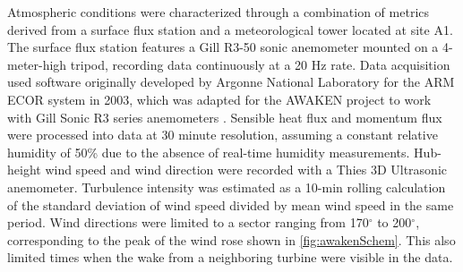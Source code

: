 \documentclass[%
 aip,
 amsmath,
 amssymb,
preprint,%
]{revtex4-2}
\begin{document}
Atmospheric conditions were characterized through a combination of metrics derived from a surface flux station \cite{a2e_awaken_surfaceMet} and a meteorological tower \cite{a2e_awaken_kp_metTower} located at site A1. The surface flux station features a Gill R3-50 sonic anemometer mounted on a 4-meter-high tripod, recording data continuously at a 20 Hz rate. Data acquisition used software originally developed by Argonne National Laboratory for the ARM ECOR system in 2003, which was adapted for the AWAKEN project to work with Gill Sonic R3 series anemometers \cite{cook2018eddy}. Sensible heat flux and momentum flux were processed into data at 30 minute resolution, assuming a constant relative humidity of 50\% due to the absence of real-time humidity measurements. 
Hub-height wind speed and wind direction were recorded with a Thies 3D Ultrasonic anemometer. Turbulence intensity was estimated as a 10-min rolling calculation of the standard deviation of wind speed divided by mean wind speed in the same period.
Wind directions were limited to a sector ranging from 170$^\circ$ to 200$^\circ$, corresponding to the peak of the wind rose shown in \cref{fig:awakenSchem}. This also limited times when the wake from a neighboring turbine were visible in the data.
\end{document}
